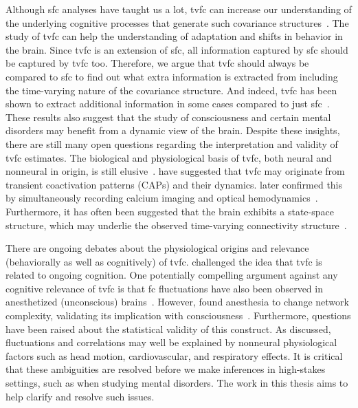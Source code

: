 Although \gls{sfc} analyses have taught us a lot, \gls{tvfc} can increase our understanding of the underlying cognitive processes that generate such covariance structures~\parencite{Cohen2018}.
The study of \gls{tvfc} can help the understanding of adaptation and shifts in behavior in the brain.
%
Since \gls{tvfc} is an extension of \gls{sfc}, all information captured by \gls{sfc} should be captured by \gls{tvfc} too.
Therefore, we argue that \gls{tvfc} should always be compared to \gls{sfc} to find out what extra information is extracted from including the time-varying nature of the covariance structure.
And indeed, \gls{tvfc} has been shown to extract additional information in some cases compared to just \gls{sfc}~\parencite[see e.g.][]{Rashid2016, Jin2017, Liegeois2019, Luppi2019, Varley2020, Vidaurre2021, Coppola2022}.
These results also suggest that the study of consciousness and certain mental disorders may benefit from a dynamic view of the brain.
%
Despite these insights, there are still many open questions regarding the interpretation and validity of \gls{tvfc} estimates.
The biological and physiological basis of \gls{tvfc}, both neural and nonneural in origin, is still elusive~\parencite{Lurie2020}.
\textcite{Liu2013, Petridou2013} have suggested that \gls{tvfc} may originate from transient coactivation patterns (CAPs) and their dynamics.
\textcite{Matsui2019} later confirmed this by simultaneously recording calcium imaging and optical hemodynamics~\parencite[see][for a review of multi-modal approaches]{Thompson2018b}.
Furthermore, it has often been suggested that the brain exhibits a state-space structure, which may underlie the observed time-varying connectivity structure~\parencite{Hutchison2013}.

There are ongoing debates about the physiological origins and relevance (behaviorally as well as cognitively) of \gls{tvfc}.
\textcite{Laumann2017} challenged the idea that \gls{tvfc} is related to ongoing cognition.
One potentially compelling argument against any cognitive relevance of \gls{tvfc} is that \gls{fc} fluctuations have also been observed in anesthetized (unconscious) brains~\parencite{Hutchison2013b}.
However, \textcite{Demertzi2019} found anesthesia to change network complexity, validating its implication with consciousness~\parencite[see also][]{Varley2020b}.
Furthermore, questions have been raised about the statistical validity of this construct.
As \textcite{Lurie2020} discussed, fluctuations and correlations may well be explained by nonneural physiological factors such as head motion, cardiovascular, and respiratory effects.
%
It is critical that these ambiguities are resolved before we make inferences in high-stakes settings, such as when studying mental disorders.
The work in this thesis aims to help clarify and resolve such issues.
